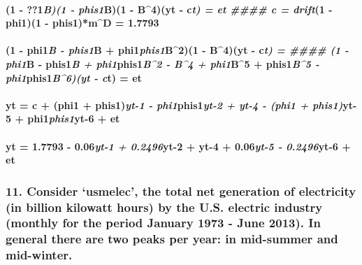 \documentclass[]{article}
\let\oldparagraph\paragraph
\renewcommand{\paragraph}[1]{\oldparagraph{#1}\mbox{}}
\begin{document}
\paragraph{\texorpdfstring{(1 - ??1\emph{B)(1 - phis1}B)(1 - B\^{}4)(yt
- c\emph{t) = et \#\#\#\# c = drift}(1 - phi1)(1 - phis1)*m\^{}D =
1.7793}{(1 - ??1B)(1 - phis1B)(1 - B\^{}4)(yt - ct) = et \#\#\#\# c = drift(1 - phi1)(1 - phis1)*m\^{}D = 1.7793}}\label{b1---phis1b1---b4yt---ct-et-c-drift1---phi11---phis1md-1.7793}

\paragraph{\texorpdfstring{(1 - phi1\emph{B - phis1}B +
phi1\emph{phis1}B\^{}2)(1 - B\^{}4)(yt - c\emph{t) = \#\#\#\# (1 -
phi1}B - phis1\emph{B + phi1}phis1\emph{B\^{}2 - B\^{}4 + phi1}B\^{}5 +
phis1\emph{B\^{}5 - phi1}phis1\emph{B\^{}6)(yt - c}t) =
et}{(1 - phi1B - phis1B + phi1phis1B\^{}2)(1 - B\^{}4)(yt - ct) = \#\#\#\# (1 - phi1B - phis1B + phi1phis1B\^{}2 - B\^{}4 + phi1B\^{}5 + phis1B\^{}5 - phi1phis1B\^{}6)(yt - ct) = et}}\label{phi1b---phis1b-phi1phis1b21---b4yt---ct-1---phi1b---phis1b-phi1phis1b2---b4-phi1b5-phis1b5---phi1phis1b6yt---ct-et}

\paragraph{\texorpdfstring{yt = c + (phi1 + phis1)\emph{yt-1 -
phi1}phis1\emph{yt-2 + yt-4 - (phi1 + phis1)}yt-5 + phi1\emph{phis1}yt-6
+
et}{yt = c + (phi1 + phis1)yt-1 - phi1phis1yt-2 + yt-4 - (phi1 + phis1)yt-5 + phi1phis1yt-6 + et}}\label{yt-c-phi1-phis1yt-1---phi1phis1yt-2-yt-4---phi1-phis1yt-5-phi1phis1yt-6-et}

\paragraph{\texorpdfstring{yt = 1.7793 - 0.06\emph{yt-1 + 0.2496}yt-2 +
yt-4 + 0.06\emph{yt-5 - 0.2496}yt-6 +
et}{yt = 1.7793 - 0.06yt-1 + 0.2496yt-2 + yt-4 + 0.06yt-5 - 0.2496yt-6 + et}}\label{yt-1.7793---0.06yt-1-0.2496yt-2-yt-4-0.06yt-5---0.2496yt-6-et}

\subsubsection{\texorpdfstring{11. Consider `usmelec', the total net
generation of electricity (in billion kilowatt hours) by the U.S.
electric industry (monthly for the period January 1973 - June 2013). In
general there are two peaks per year: in mid-summer and
mid-winter.}{11. Consider usmelec, the total net generation of electricity (in billion kilowatt hours) by the U.S. electric industry (monthly for the period January 1973 - June 2013). In general there are two peaks per year: in mid-summer and mid-winter.}}\label{consider-usmelec-the-total-net-generation-of-electricity-in-billion-kilowatt-hours-by-the-u.s.-electric-industry-monthly-for-the-period-january-1973---june-2013.-in-general-there-are-two-peaks-per-year-in-mid-summer-and-mid-winter.}
\end{document}

